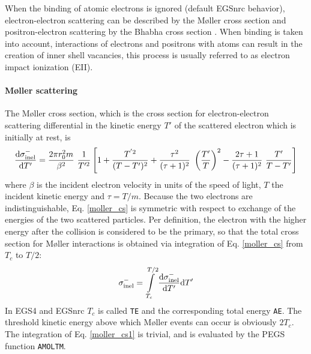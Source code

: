 
When the binding of atomic electrons is ignored (default EGSnrc behavior),
electron-electron scattering can be described by the
M{\o}ller cross section \cite{Mo32a} and
positron-electron scattering by the Bhabha cross section
\cite{Bh35}. When binding is taken into account, interactions of
electrons and positrons with atoms can result in the creation of inner
shell vacancies, this process is usually referred to as electron impact
ionization (EII).

\paragraph{M{\o}ller scattering} \hfill
{}

The M{\o}ller cross section, which is the cross section
for electron-electron scattering differential in the kinetic energy
$T'$ of the scattered electron which is initially at rest, is
\cite{ICRU37}
\begin{equation}
\label{moller_cs}
{{\rm d} \sigma_{\rm inel}^- \over  {\rm d}T'} =
{2 \pi r_0^2 m \over \beta^2}~\frac{1}{T^{\prime 2}} \left[
1 + {T^{' 2} \over (T - T')^2} + {\tau^2 \over (\tau+1)^2}~
\left(\frac{T'}{T}\right)^2
- {2 \tau + 1 \over (\tau + 1)^2}~{T' \over T - T'} \right]
\end{equation}
where $\beta$ is the incident electron velocity in units of the
speed of light, $T$ the incident kinetic energy and $\tau = T/m$.
Because the two electrons are indistinguishable, Eq. \eqref{moller_cs}
is symmetric with respect to exchange of the energies of the two scattered
particles. Per definition, the electron with the higher energy
after the collision is considered to be the primary, so that
the total cross section for M{\o}ller interactions is obtained
via integration of Eq. \eqref{moller_cs} from $T_c$ to $T/2$:
\begin{equation}
\label{moller_cs1}
\sigma_{\rm inel}^- = \int\limits_{T_c}^{T/2}
{{\rm d} \sigma_{\rm inel}^- \over  {\rm d}T'} {\rm d}T'
\end{equation}
In EGS4 and EGSnrc $T_c$ is called {\tt TE} and the corresponding
total energy {\tt AE}. The threshold kinetic energy above which M{\o}ller
events can occur is obviously $2 T_c$. The integration of
Eq. \eqref{moller_cs1} is trivial, and is evaluated by the
PEGS function {\tt AMOLTM}.

